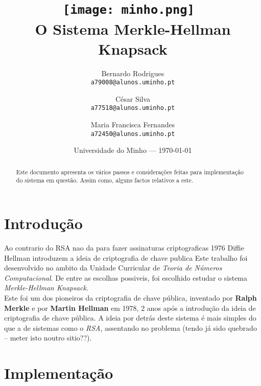 \documentclass[11pt, language=portuguese]{report}
\begin{document}
\title{\texttt{[image: minho.png]}~\\[1cm] O Sistema Merkle-Hellman Knapsack}

\author{Bernardo Rodrigues\\ \texttt{a79008@alunos.uminho.pt}\\ \and César Silva\\ \texttt{a77518@alunos.uminho.pt}\\ \and Maria Francisca Fernandes\\ \texttt{a72450@alunos.uminho.pt}\\}

\date{Universidade do Minho --- \today}

\maketitle

\begin{abstract}

	Este documento apresenta os vários passos e considerações feitas para implementação do sistema em questão. Assim como, alguns factos relativos a este.  


\end{abstract}

\tableofcontents

\listofalgorithms

\chapter{Introdução}

Ao contrario do RSA nao da para fazer assinaturas criptograficas
1976 Diffie Hellman introduzem a ideia de criptografia de chave publica
Este trabalho foi desenvolvido no ambito da Unidade Curricular de \textit{Teoria de Números Computacional}. De entre as escolhas possiveis, foi escolhido estudar o sistema \textit{Merkle-Hellman Knapsack}. \\
Este foi um dos pioneiros da criptografia de chave pública, inventado por \textbf{Ralph Merkle} e por \textbf{Martin Hellman} em 1978, 2 anos após a introdução da ideia de criptografia de chave pública.
A ideia por detrás deste sistema é mais simples do que a de sistemas como o \textit{RSA}, assentando no problema  (tendo já sido quebrado -- meter isto noutro sitio??).

\chapter{Implementação}
\end{document}
